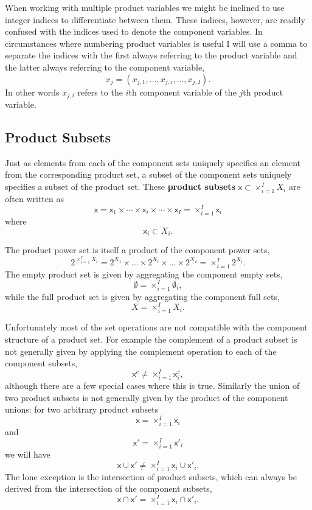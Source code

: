 \documentclass[
  letterpaper,
  DIV=11,
  numbers=noendperiod]{scrartcl}
\begin{document}
When working with multiple product variables we might be inclined to use
integer indices to differentiate between them. These indices, however,
are readily confused with the indices used to denote the component
variables. In circumstances where numbering product variables is useful
I will use a comma to separate the indices with the first always
referring to the product variable and the latter always referring to the
component variable, \[
x_{j} = ( x_{j, 1}, \ldots, x_{j, i}, \ldots, x_{j, I}).
\] In other words \(x_{j, i}\) refers to the \(i\)th component variable
of the \(j\)th product variable.

\hypertarget{product-subsets}{%
\subsection{Product Subsets}\label{product-subsets}}

Just as elements from each of the component sets uniquely specifies an
element from the corresponding product set, a subset of the component
sets uniquely specifies a subset of the product set. These
\textbf{product subsets} \(\mathsf{x} \subset \times_{i = 1}^{I} X_{i}\)
are often written as \[
\mathsf{x}
=
\mathsf{x}_{1} \times \cdots \times
\mathsf{x}_{i} \times \cdots \times
\mathsf{x}_{I}
=
\times_{i = 1}^{I} \mathsf{x}_{i}
\] where \[
\mathsf{x}_{i} \subset X_{i}.
\]

The product power set is itself a product of the component power sets,
\[
2^{ \times_{i = 1}^{I} X_{i} }
=
2^{X_{1}} \times \ldots \times 2^{X_{i}} \times \ldots \times 2^{X_{I}}
=
\times_{i = 1}^{I} 2^{X_{i}}.
\] The empty product set is given by aggregating the component empty
sets, \[
\emptyset = \times_{i = 1}^{I} \emptyset_{i},
\] while the full product set is given by aggregating the component full
sets, \[
X = \times_{i = 1}^{I} X_{i}.
\]

Unfortunately most of the set operations are not compatible with the
component structure of a product set. For example the complement of a
product subset is not generally given by applying the complement
operation to each of the component subsets, \[
\mathsf{x}^{c} \ne \times_{i = 1}^{I} \mathsf{x}_{i}^{c},
\] although there are a few special cases where this is true. Similarly
the union of two product subsets is not generally given by the product
of the component unions: for two arbitrary product subsets \[
\mathsf{x} = \times_{i = 1}^{I} \mathsf{x}_{i}
\] and \[
\mathsf{x}' = \times_{i = 1}^{I} \mathsf{x}'_{i}
\] we will have \[
\mathsf{x} \cup \mathsf{x}'
\ne
\times_{i = 1}^{I} \mathsf{x}_{i} \cup \mathsf{x}'_{i}.
\] The lone exception is the intersection of product subsets, which can
always be derived from the intersection of the component subsets, \[
\mathsf{x} \cap \mathsf{x}'
=
\times_{i = 1}^{I} \mathsf{x}_{i} \cap \mathsf{x}'_{i}.
\]
\end{document}
